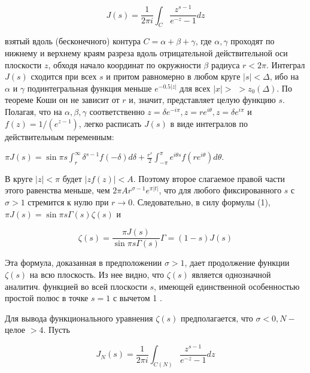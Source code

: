 \documentclass[10pt]{article}
\begin{document}
\[

J(s)=\frac{1}{2 \pi i} \int_{C} \frac{z^{s-1}}{e^{-z}-1} d z

\]



взятый вдоль (бесконечного) контура $C=\alpha+\beta+\gamma$, где $\alpha, \gamma$ проходят по нижнему и верхнему краям разреза вдоль отрицательной действительной оси плоскости $z$, обходя начало координат по окружности $\beta$ радиуса $r<2 \pi$. Интеграл $J(s)$ сходится при всех $s$ и притом равномерно в любом круге $|s|<\Delta$, ибо на $\alpha$ и $\gamma$ подинтегральная функция меньше $e^{-0.5|z|}$ для всех $|x|>$ $>z_{0}(\Delta)$. По теореме Коши он не зависит от $r$ и, значит, представляет целую функцию $s$. Полагая, что на $\alpha, \beta, \gamma$ соответственно $z=\delta e^{-i \pi}, z=r e^{i \theta}, z=\delta e^{i \pi}$ и $f(z)=1 /\left(e^{z-1}\right)$, легко расписать $J(s)$ в виде интегралов по действительным переменным:



$\pi J(s)=\sin \pi s \int_{r}^{\infty} \delta^{s-1} f(-\delta) d \delta+\frac{r^{s}}{2} \int_{-\pi}^{\pi} e^{i \theta s} f\left(r e^{i \theta}\right) d \theta$.



В круге $|z|<\pi$ будет $|z f(z)|<A$. Поэтому второе слагаемое правой части этого равенства меньше, чем $2 \pi A r^{\sigma-1} e^{\pi|t|}$, что для любого фиксированного $s$ с $\sigma>1$ стремится к нулю при $r \rightarrow 0$. Следовательно, в силу формулы (1), $\pi J(s)=\sin \pi s \Gamma(s) \zeta(s)$ и



\[

\zeta(s)=\frac{\pi J(s)}{\sin \pi s \Gamma(s)} \Gamma=(1-s) J(s)

\]



Эта формула, доказанная в предположении $\sigma>1$, дает продолжение функции $\zeta(s)$ на всю плоскость. Из нее видно, что $\zeta(s)$ является однозначной аналитич. функцией во всей плоскости $s$, имеющей единственной особенностью простой полюс в точке $s=1$ с вычетом 1 .



Для вывода функционального уравнения $\zeta(s)$ предполагается, что $\sigma<0, N-$ целое $>4$. Пусть



\[

J_{N}(s)=\frac{1}{2 \pi i} \int_{C(N)} \frac{z^{s-1}}{e^{-z}-1} d z

\]
\end{document}
